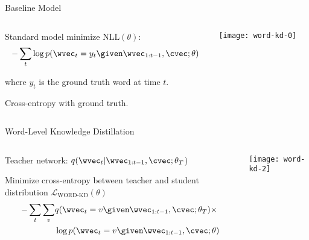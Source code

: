 \begin{frame}{Baseline Model}

\begin{columns}
\begin{column}{7cm}
Standard model minimize $\text{NLL}(\theta)$: 
\air
$$-\sum_t \log p(\wvec_t=y_t \given \wvec_{1:t-1}, \cvec ; \theta)$$

where $y_t$ is the ground truth word at time $t$.

\air 

Cross-entropy with ground truth.

\end{column}
\begin{column}{8cm}
\texttt{[image: word-kd-0]}
\end{column}
\end{columns}
\end{frame}



\begin{frame}{Word-Level Knowledge Distillation}

\begin{columns}
\begin{column}{7cm}
Teacher network: $q(\wvec_{t} | \wvec_{1:t-1}, \cvec  ; \theta_T$)  
\air 

Minimize cross-entropy between teacher and student distribution  $\mathcal{L}_{\text{WORD-KD}}(\theta)$ \\

\begin{align*}
-\sum_t \sum_v &q(\wvec_t=v \given \wvec_{1: t-1}, \cvec ; \theta_T)\times \\
& \log p(\wvec_t =v \given \wvec_{1: t-1}, \cvec ; \theta)
\end{align*}
\end{column}

\begin{column}{7cm}
\centering

\texttt{[image: word-kd-2]}
\end{column}
\end{columns}
\end{frame}


